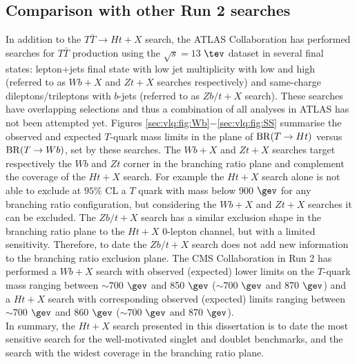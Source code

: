 \subsection{Comparison with other Run 2 searches}

In addition to the  $T\bar{T}\to Ht+X$ search, the ATLAS Collaboration has performed searches for $T\bar{T}$ production using the $\sqrt{s}=13$ $\tev$ dataset in several final states: lepton+jets final state with low jet multiplicity with low and high \MET (referred to as $Wb+X$ \cite{ATLAS-CONF-2016-102} and $Zt+X$ \cite{ATLAS-CONF-2016-101} searches respectively) and same-charge dileptons/trileptons with $b$-jets \cite{ATLAS-CONF-2016-032} (referred to as $Zb/t+X$ search). These searches have overlapping selections and thus a combination of all analyses in ATLAS has not been attempted yet. Figures \ref{sec:vlq:fig:Wb}$-$\ref{sec:vlq:fig:SS} summarise the observed and expected $T$-quark mass limits in the plane of ${\rm BR}(T \to Ht)$ versus ${\rm BR}(T \to Wb)$, set by these searches.
The $Wb+X$ and $Zt+X$ searches target respectively the $Wb$ and $Zt$ corner in the branching ratio plane and complement the coverage of the $Ht+X$ search. For example the $Ht+X$ search alone is not able to exclude at $95\%$ CL a $T$ quark with mass below 900 $\gev$ for any branching ratio configuration, but considering the $Wb+X$ and $Zt+X$ searches it can be excluded. The $Zb/t+X$ search has a similar exclusion shape in the branching ratio plane to the $Ht+X$ 0-lepton channel, but with a limited sensitivity. Therefore, to date the $Zb/t+X$ search does not add new information to the branching ratio exclusion plane.
The CMS Collaboration in Run 2 has performed a $Wb+X$ search \cite{CMS-PAS-B2G-16-002} with  observed (expected) lower limits on the $T$-quark mass ranging between $\sim700$ $\gev$ and 850 $\gev$ ($\sim700$ $\gev$ and 870 $\gev$) and a $Ht+X$ search \cite{CMS-PAS-B2G-16-011} with corresponding  observed (expected) limits ranging between $\sim700$ $\gev$ and 860 $\gev$ ($\sim700$ $\gev$ and 870 $\gev$).\\ \indent
In summary, the $Ht+X$ search presented in this dissertation is  to date the most sensitive search for the well-motivated singlet and doublet benchmarks, and the search with the widest coverage in the branching ratio plane.


